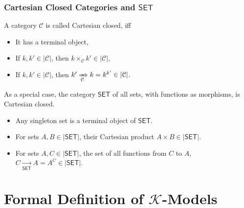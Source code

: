 \begin{frame}[fragile]
    \frametitle{Cartesian Closed Categories and $\mathbf{\mathsf{SET}}$}
    
    A category $\mathcal{C}$ is called Cartesian closed, iff
    \begin{itemize}
        \item It has a terminal object,
        \item If $k, k' \in |\mathcal{C}|$, then $k \times_\mathcal{C} k' \in |\mathcal{C}|$,
        \item If $k, k' \in |\mathcal{C}|$, then $k' \xRightarrow[\mathcal{C}]{} k = k^{k'} \in |\mathcal{C}|$.
    \end{itemize}
    
    \vspace{1em}
    As a special case, the category $\mathsf{SET}$ of all sets, with functions as morphisms, is Cartesian closed.
    \begin{itemize}
        \item Any singleton set is a terminal object of $\mathsf{SET}$.
        \item For sets $A, B \in |\mathsf{SET}|$, their Cartesian product $A \times B \in |\mathsf{SET}|$.
        \item For sets $A, C \in |\mathsf{SET}|$, the set of all functions from $C$ to $A$, $C \xrightarrow[\mathsf{SET}]{} A = A^C \in |\mathsf{SET}|$.
    \end{itemize}
\end{frame}

\section{Formal Definition of $\mathcal{K}$-Models}

